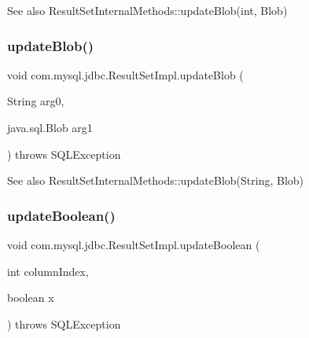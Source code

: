 \begin{DoxySeeAlso}{See also}
Result\+Set\+Internal\+Methods\+::update\+Blob(int, Blob) 
\end{DoxySeeAlso}
\mbox{\label{classcom_1_1mysql_1_1jdbc_1_1_result_set_impl_a9c8337c305d3d92c2f94fd6aef04566d}} 
\subsubsection{\texorpdfstring{update\+Blob()}{updateBlob()}\hspace{0.1cm}{\footnotesize\ttfamily [2/2]}}
{\footnotesize\ttfamily void com.\+mysql.\+jdbc.\+Result\+Set\+Impl.\+update\+Blob (\begin{DoxyParamCaption}\item[{String}]{arg0,  }\item[{java.\+sql.\+Blob}]{arg1 }\end{DoxyParamCaption}) throws S\+Q\+L\+Exception}

\begin{DoxySeeAlso}{See also}
Result\+Set\+Internal\+Methods\+::update\+Blob(\+String, Blob) 
\end{DoxySeeAlso}
\mbox{\label{classcom_1_1mysql_1_1jdbc_1_1_result_set_impl_a60710525a754d8fe76c4ff0f963ff1f7}} 
\subsubsection{\texorpdfstring{update\+Boolean()}{updateBoolean()}\hspace{0.1cm}{\footnotesize\ttfamily [1/2]}}
{\footnotesize\ttfamily void com.\+mysql.\+jdbc.\+Result\+Set\+Impl.\+update\+Boolean (\begin{DoxyParamCaption}\item[{int}]{column\+Index,  }\item[{boolean}]{x }\end{DoxyParamCaption}) throws S\+Q\+L\+Exception}

